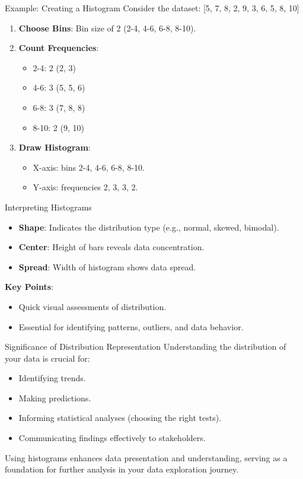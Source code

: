 \documentclass[aspectratio=169]{beamer}
\begin{document}
\begin{frame}[fragile]{Example: Creating a Histogram}
  Consider the dataset: [5, 7, 8, 2, 9, 3, 6, 5, 8, 10]
  \begin{enumerate}
    \item \textbf{Choose Bins}: Bin size of 2 (2-4, 4-6, 6-8, 8-10).
    \item \textbf{Count Frequencies}:
      \begin{itemize}
        \item 2-4: 2 (2, 3)
        \item 4-6: 3 (5, 5, 6)
        \item 6-8: 3 (7, 8, 8)
        \item 8-10: 2 (9, 10)
      \end{itemize}
    \item \textbf{Draw Histogram}:
      \begin{itemize}
        \item X-axis: bins 2-4, 4-6, 6-8, 8-10.
        \item Y-axis: frequencies 2, 3, 3, 2.
      \end{itemize}
  \end{enumerate}
\end{frame}

\begin{frame}[fragile]{Interpreting Histograms}
  \begin{itemize}
    \item \textbf{Shape}: Indicates the distribution type (e.g., normal, skewed, bimodal).
    \item \textbf{Center}: Height of bars reveals data concentration.
    \item \textbf{Spread}: Width of histogram shows data spread.
  \end{itemize}
  
  \textbf{Key Points}:
  \begin{itemize}
    \item Quick visual assessments of distribution.
    \item Essential for identifying patterns, outliers, and data behavior.
  \end{itemize}
\end{frame}

\begin{frame}[fragile]{Significance of Distribution Representation}
  Understanding the distribution of your data is crucial for:
  \begin{itemize}
    \item Identifying trends.
    \item Making predictions.
    \item Informing statistical analyses (choosing the right tests).
    \item Communicating findings effectively to stakeholders.
  \end{itemize}
  Using histograms enhances data presentation and understanding, serving as a foundation for further analysis in your data exploration journey.
\end{frame}
\end{document}
